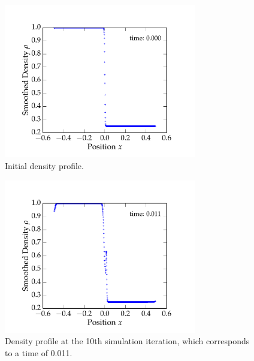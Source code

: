 \documentclass{article}
\begin{document}
\begin{spacing}{1.1}
\begin{figure}[H]
 \centering
 \hspace{0cm} \includegraphics[width=0.75\textwidth]{figs/fig_1.pdf}
 \caption{Initial density profile.}
 \label{fig_1}
\end{figure} 

\begin{figure}[H]
 \centering
 \hspace{0cm} \includegraphics[width=0.75\textwidth]{figs/fig_10.pdf}
 \caption{Density profile at the 10th simulation iteration, which corresponds to a time of 0.011.}
 \label{fig_10}
\end{figure} 


\end{spacing}
\end{document}
